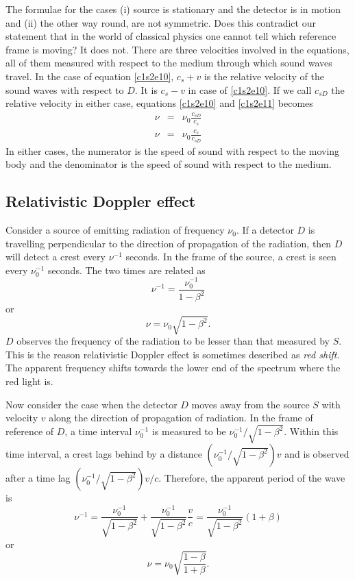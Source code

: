 The formulae for the cases (i) source is stationary and the detector is in 
motion and (ii) the other way round, are not symmetric. Does this contradict
our statement that in the world of classical physics one cannot tell which
reference frame is moving? It does not. There are three velocities involved
in the equations, all of them measured with respect to the medium through 
which sound waves travel. In the case of equation \eqref{c1s2e10}, $c_s + v$
is the relative velocity of the sound waves with respect to $D$. It is $c_s
-v$ in case of \eqref{c1s2e10}. If we call $c_{sD}$ the relative velocity
in either case, equations \eqref{c1s2e10} and \eqref{c1s2e11} becomes
\begin{eqnarray}
\nu &=& \nu_0\frac{c_{sD}}{c_s} \\
\nu &=& \nu_0\frac{c_s}{c_{sD}}
\end{eqnarray}
In either cases, the numerator is the speed of sound with respect to the moving
body and the denominator is the speed of sound with respect to the medium.

\subsection{Relativistic Doppler effect}
Consider a source of emitting radiation of frequency $\nu_0$. If a detector
$D$ is travelling perpendicular to the direction of propagation of the
radiation, then $D$ will detect a crest every $\nu^{-1}$ seconds. In the frame
of the source, a crest is seen every $\nu_0^{-1}$ seconds. The two times are
related as
\[
\nu^{-1} = \frac{\nu_0^{-1}}{1 - \beta^2}
\]
or
\begin{equation}\label{c1s2e14}
\nu = \nu_0\sqrt{1 - \beta^2}.
\end{equation}
$D$ observes the frequency of the radiation to be lesser than that measured by
$S$. This is the reason relativistic Doppler effect is sometimes described as
\emph{red shift}. The apparent frequency shifts towards the lower end of the
spectrum where the red light is. 

Now consider the case when the detector $D$ moves away from the source $S$ with
velocity $v$ along the direction of propagation of radiation. In the frame of
reference of $D$, a time interval $\nu_0^{-1}$ is measured to be 
$\nu_0^{-1}/\sqrt{1 - \beta^2}$. Within this time interval, a crest lags behind
by a distance $(\nu_0^{-1}/\sqrt{1 - \beta^2})v$ and is observed after a time lag
$(\nu_0^{-1}/\sqrt{1 - \beta^2})v/c$. Therefore, the apparent period of the wave 
is
\[
\nu^{-1} = \frac{\nu_0^{-1}}{\sqrt{1 - \beta^2}} + 
\frac{\nu_0^{-1}}{\sqrt{1 - \beta^2}}\frac{v}{c} = 
\frac{\nu_0^{-1}}{\sqrt{1 - \beta^2}}(1 + \beta)
\]
or
\begin{equation}\label{c1s2e15}
\nu = \nu_0\sqrt{\frac{1 - \beta}{1 + \beta}}.
\end{equation}

